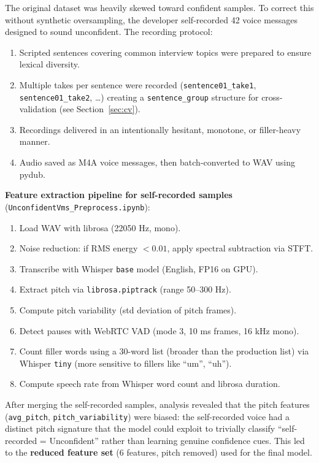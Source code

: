 \documentclass[12pt,a4paper]{article}
\begin{document}
The original dataset was heavily skewed toward confident samples. To correct this without synthetic oversampling, the developer self-recorded 42 voice messages designed to sound unconfident. The recording protocol:

\begin{enumerate}[leftmargin=2em]
  \item Scripted sentences covering common interview topics were prepared to ensure lexical diversity.
  \item Multiple takes per sentence were recorded (\texttt{sentence01\_take1}, \texttt{sentence01\_take2}, \ldots) creating a \texttt{sentence\_group} structure for cross-validation (see Section~\ref{sec:cv}).
  \item Recordings delivered in an intentionally hesitant, monotone, or filler-heavy manner.
  \item Audio saved as M4A voice messages, then batch-converted to WAV using pydub.
\end{enumerate}

\textbf{Feature extraction pipeline for self-recorded samples} (\texttt{UnconfidentVms\_Preprocess.ipynb}):

\begin{enumerate}[leftmargin=2em]
  \item Load WAV with librosa (22050 Hz, mono).
  \item Noise reduction: if RMS energy $< 0.01$, apply spectral subtraction via STFT.
  \item Transcribe with Whisper \texttt{base} model (English, FP16 on GPU).
  \item Extract pitch via \texttt{librosa.piptrack} (range 50--300 Hz).
  \item Compute pitch variability (std deviation of pitch frames).
  \item Detect pauses with WebRTC VAD (mode 3, 10 ms frames, 16 kHz mono).
  \item Count filler words using a 30-word list (broader than the production list) via Whisper \texttt{tiny} (more sensitive to fillers like ``um'', ``uh'').
  \item Compute speech rate from Whisper word count and librosa duration.
\end{enumerate}

\begin{warningbox}
After merging the self-recorded samples, analysis revealed that the pitch features (\texttt{avg\_pitch}, \texttt{pitch\_variability}) were biased: the self-recorded voice had a distinct pitch signature that the model could exploit to trivially classify ``self-recorded = Unconfident'' rather than learning genuine confidence cues. This led to the \textbf{reduced feature set} (6 features, pitch removed) used for the final model.
\end{warningbox}
\end{document}
